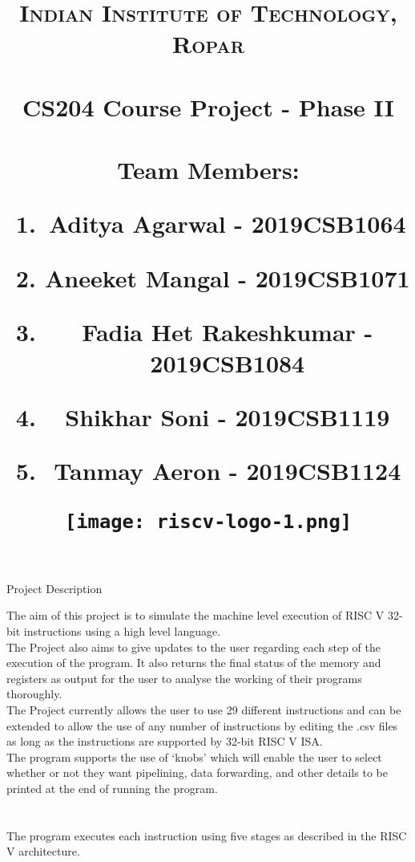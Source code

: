 \documentclass{article}
\title{ 
\normalfont \large 
\textsc{Indian Institute of Technology, Ropar} \\    [40pt] 
\horrule{} \\[0.4cm] 
\Huge CS204 Course Project - Phase II\\ 
\horrule{} \\[0.5cm]
\protect\vspace{2.0cm}
\large
\textup{Team Members:}\\\vspace{1cm}
\begin{centering}
\begin{enumerate}
    \item Aditya Agarwal - 2019CSB1064
    \item Aneeket Mangal - 2019CSB1071
    \item Fadia Het Rakeshkumar - 2019CSB1084
    \item Shikhar Soni - 2019CSB1119
    \item Tanmay Aeron - 2019CSB1124
\end{enumerate}
\end{centering}
\date{}
\centering
\protect\vspace{4.0cm}
\texttt{[image: riscv-logo-1.png]}
}
\begin{document}
\maketitle
\newpage
\begin{centering}
\begin{Huge}
\textsf{Project Description}\\
\end{Huge}
\end{centering}
\protect\vspace{2.0cm}
\Large
The aim of this project is to simulate the machine level execution of RISC V 32-bit instructions using a high level language.\\

The Project also aims to give updates to the user regarding each step of the execution of the program. It also returns the final status of the memory and registers as output for the user to analyse the working of their programs thoroughly.\\

The Project currently allows the user to use 29 different instructions and can be extended to allow the use of any number of instructions by editing the .csv files as long as the instructions are supported by 32-bit RISC V ISA. \\

The program supports the use of `knobs' which will enable the user to select whether or not they want pipelining, data forwarding, and other details to be printed at the end of running the program.\\\\\\
The program executes each instruction using five stages as described in the RISC V architecture.\\
\end{document}
